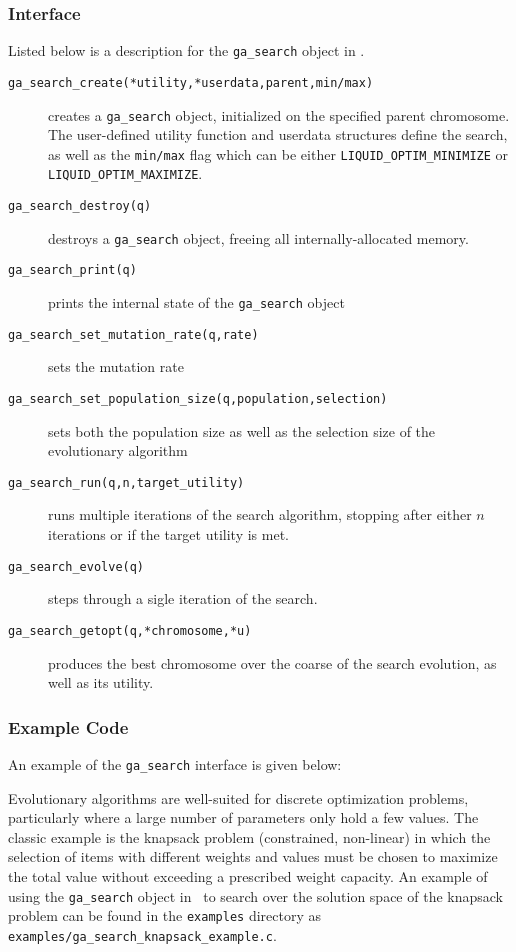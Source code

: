 \subsubsection{Interface}
\label{module:optim:ga_search:interface}
%
Listed below is a description for the {\tt ga\_search} object in
\liquid.
%
\begin{description}
\item[{\tt ga\_search\_create(*utility,*userdata,parent,min/max)}]
    creates a {\tt ga\_search} object, initialized on the specified
    parent chromosome.
    The user-defined utility function and userdata structures define the
    search, as well as the {\tt min/max} flag which can be either
    {\tt LIQUID\_OPTIM\_MINIMIZE} or
    {\tt LIQUID\_OPTIM\_MAXIMIZE}.
\item[{\tt ga\_search\_destroy(q)}]
    destroys a {\tt ga\_search} object, freeing all internally-allocated
    memory.
\item[{\tt ga\_search\_print(q)}]
    prints the internal state of the {\tt ga\_search} object
\item[{\tt ga\_search\_set\_mutation\_rate(q,rate)}]
    sets the mutation rate
\item[{\tt ga\_search\_set\_population\_size(q,population,selection)}]
    sets both the population size as well as the selection size of the
    evolutionary algorithm
\item[{\tt ga\_search\_run(q,n,target\_utility)}]
    runs multiple iterations of the search algorithm,
    stopping after either $n$ iterations or if the target utility is
    met.
\item[{\tt ga\_search\_evolve(q)}]
    steps through a sigle iteration of the search.
\item[{\tt ga\_search\_getopt(q,*chromosome,*u)}]
    produces the best chromosome over the coarse of the search
    evolution, as well as its utility.
\end{description}
%

\subsubsection{Example Code}
\label{module:optim:ga_search:example}
An example of the {\tt ga\_search} interface is given below:
%

%
Evolutionary algorithms are well-suited for discrete optimization
problems, particularly where a large number of parameters only hold a
few values.
The classic example is the knapsack problem (constrained, non-linear)
in which the selection of items with different weights and values must
be chosen to maximize the total value without exceeding a prescribed
weight capacity.
An example of using the {\tt ga\_search} object in \liquid\ to search
over the solution space of the knapsack problem can be found in the
{\tt examples} directory as
{\tt examples/ga\_search\_knapsack\_example.c}.

